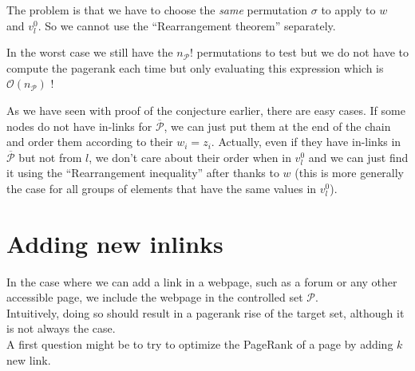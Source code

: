 \documentclass{article}
\newcommand{\bigoh}{\mathcal{O}}
\newcommand{\1}{\mathbf{1}}
\theoremstyle{definition}
\begin{document}
The problem is that we have to choose the \emph{same} permutation \(\sigma\) to apply to \(w\) and \(v_l^0\).
So we cannot use the ``Rearrangement theorem'' separately.

In the worst case we still have the \(n_\mathcal{P}!\) permutations to test
but we do not have to compute the pagerank each time but only evaluating this expression which is \(\bigoh(n_\mathcal{P})\) !

As we have seen with proof of the conjecture earlier, there are easy cases.
If some nodes do not have in-links for $\overline{\mathcal{P}}$, we can just put them at the end of the chain and order them
according to their $w_i = z_i$.
Actually, even if they have in-links in $\overline{\mathcal{P}}$ but not from $l$,
we don't care about their order when in $v_l^0$ and we can just find it using the ``Rearrangement inequality'' after thanks to $w$ (this is more generally the case for all groups of elements that have the same values in $v_l^0$).

%

\section{Adding new inlinks}
In the case where we can add a link in a webpage, such as a forum or any other accessible page, we include the webpage in the controlled set \(\mathcal{P}\).\\
Intuitively, doing so should result in a pagerank rise of the target set, although it is not always the case.\\
A first question might be to try to optimize the PageRank of a page
by adding \(k\) new link.
\end{document}
